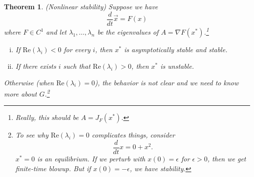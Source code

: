 \documentclass{tufte-handout}
\newtheorem{thm}{Theorem}[subsection]
\theoremstyle{definition}
\begin{document}
\begin{thm}
	(Nonlinear stability) Suppose we have \[
		\frac{d}{dt} \vec x = F(x)
	\] where $F \in C^1$ and let $\lambda_1,\ldots,\lambda_n$ be the eigenvalues of $A = \nabla F(x^*)$.\footnote{Really, this should be $A = J_F(x^*)$.} 
	\begin{enumerate}[(i)]
		\item If $\text{Re} (\lambda_i) < 0$ for every $i$, then $x^*$ is asymptotically stable and stable.
		\item If there exists $i$ such that $\text{Re} (\lambda_i) > 0$, then $x^*$ is unstable.
	\end{enumerate}
	Otherwise (when $\text{Re} (\lambda_i) = 0$), the behavior is not clear and we need to know more about $G$.\footnote{To see why $\text{Re} (\lambda_i) = 0$ complicates things, consider \[
		\frac{d}{dt}x = 0 + x^2
	.\] $x^* = 0$ is an equilibrium. If we perturb with $x(0) = \epsilon$ for $\epsilon>0$, then we get finite-time blowup. But if $x(0) = -\epsilon$, we have stability.}
\end{thm}
\end{document}
